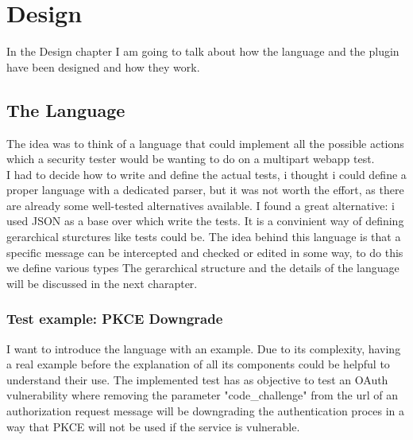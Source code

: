 \chapter{Design}
In the Design chapter I am going to talk about how the language and the plugin have been designed and how they work.

\section{The Language}
The idea was to think of a language that could implement all the possible actions which a security tester would be wanting to do on a multipart webapp test.\\
I had to decide how to write and define the actual tests, i thought i could define a proper language with a dedicated parser, but it was not worth the effort, as there are already some well-tested alternatives available. I found a great alternative: i used JSON as a base over which write the tests. It is a convinient way of defining gerarchical sturctures like tests could be.
The idea behind this language is that a specific message can be intercepted and checked or edited in some way, to do this we define various types
The gerarchical structure and the details of the language will be discussed in the next charapter.

\subsection{Test example: PKCE Downgrade}
I want to introduce the language with an example. Due to its complexity, having a real example before the explanation of all its components could be helpful to understand their use.
The implemented test has as objective to test an OAuth vulnerability where removing the parameter "code\_challenge" from the url of an authorization request message will be downgrading the authentication proces in a way that PKCE will not be used if the service is vulnerable.


